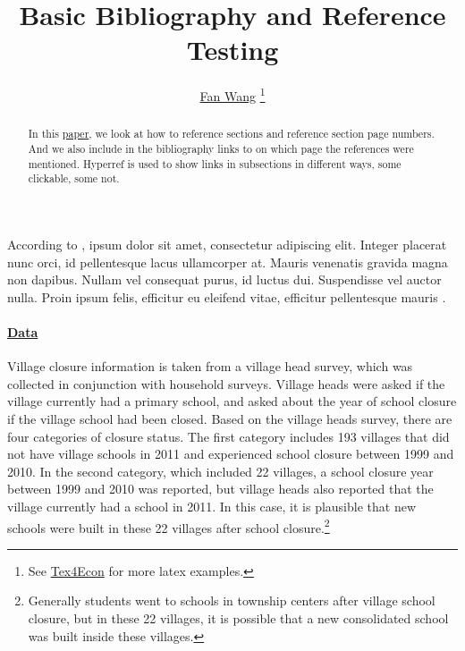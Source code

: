 \documentclass[12pt,english]{article}
\begin{document}
\title{Basic Bibliography and Reference Testing}
\author{\href{http://fanwangecon.github.io/}{Fan Wang} \thanks{See \href{https://fanwangecon.github.io/Tex4Econ/}{Tex4Econ} for more latex examples.}}

\maketitle
\begin{abstract}
\singlespacing In this \href{https://papers.ssrn.com/sol3/papers.cfm?abstract_id=3140132}{paper}, we look at how to reference sections and reference section page numbers. And we also include in the bibliography links to on which page the references were mentioned. Hyperref is used to show links in subsections in different ways, some clickable, some not.\end{abstract}
\vfill
\pagebreak{}


\maketitle

According to \textcite{becker_human_1986}, ipsum dolor sit amet, consectetur adipiscing elit. Integer placerat nunc orci, id pellentesque lacus ullamcorper at. Mauris venenatis gravida magna non dapibus. Nullam vel consequat purus, id luctus dui. Suspendisse vel auctor nulla. Proin ipsum felis, efficitur eu eleifend vitae, efficitur pellentesque mauris \autocite{becker_human_1986}.

\paragraph{\href{https://papers.ssrn.com/sol3/papers.cfm?abstract_id=3140132}{Data}}

Village closure information is taken from a village head survey, which was collected in conjunction with household surveys. Village heads were asked if the village currently had a primary school, and asked about the year of school closure if the village school had been closed. Based on the village heads survey, there are four categories of closure status. The first category includes 193 villages that did not have village schools in 2011 and experienced school closure between 1999 and 2010. In the second category, which included 22 villages, a school closure year between 1999 and 2010 was reported, but village heads also reported that the village currently had a school in 2011. In this case, it is plausible that new schools were built in these 22 villages after school closure.\footnote{Generally students went to schools in township centers after village school closure, but in these 22 villages, it is possible that a new consolidated school was built inside these villages.}
\end{document}

